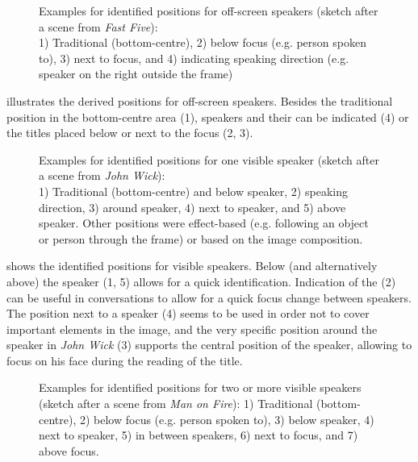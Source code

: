 \begin{figure}
\caption{Examples for identified positions for off-screen speakers (sketch after a scene from \textit{Fast Five}): \\
1) Traditional (bottom-centre), 2) below focus (e.g. person spoken to), 3) next to focus, and 4) indicating speaking direction (e.g. speaker on the right outside the frame)}
\label{fig:FIG39}
\end{figure}

 illustrates the derived positions for off-screen speakers. Besides the traditional position in the bottom-centre area (1), speakers and their  can be indicated (4) or the titles placed below or next to the focus (2, 3).

\begin{figure}
\caption{Examples for identified positions for one visible speaker (sketch after a scene from \textit{John Wick}): \\
1) Traditional (bottom-centre) and below speaker, 2)  {speaking direction}, 3) around speaker, 4) next to speaker, and 5) above speaker. Other positions were effect-based (e.g. following an object or person through the frame) or based on the {image composition}.}
\label{fig:FIG40}
\end{figure}

 shows the identified positions for visible speakers. Below (and alternatively above) the speaker (1, 5) allows for a quick identification. Indication of the  (2) can be useful in conversations to allow for a quick focus change between speakers. The position next to a speaker (4) seems to be used in order not to cover important elements in the image, and the very specific position around the speaker in \textit{John Wick} (3) supports the central position of the speaker, allowing to focus on his face during the reading of the title.

  

\begin{figure}[b]
\caption{Examples for identified positions for two or more visible speakers (sketch after a scene from \textit{Man on Fire}): 1) Traditional (bottom-centre), 2) below focus (e.g. person spoken to), 3) below speaker, 4) next to speaker, 5) in between speakers, 6) next to focus, and 7) above focus.}
\label{fig:FIG41}
\end{figure}

